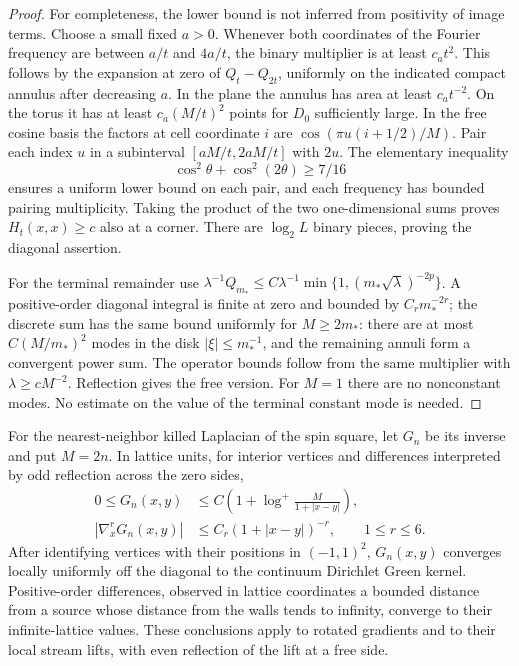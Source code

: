 \begin{proof}
For completeness, the lower bound is not inferred from positivity of image terms.  Choose a small fixed $a>0$.  Whenever both coordinates of the Fourier frequency are between $a/t$ and $4a/t$, the binary multiplier is at least $c_at^2$.  This follows by the expansion at zero of $Q_t-Q_{2t}$, uniformly on the indicated compact annulus after decreasing $a$.  In the plane the annulus has area at least $c_at^{-2}$.  On the torus it has at least $c_a(M/t)^2$ points for $D_0$ sufficiently large.  In the free cosine basis the factors at cell coordinate $i$ are $\cos(\pi u(i+1/2)/M)$.  Pair each index $u$ in a subinterval $[aM/t,2aM/t]$ with $2u$.  The elementary inequality
\[
 \cos^2\theta+\cos^2(2\theta)\ge7/16
\]
ensures a uniform lower bound on each pair, and each frequency has bounded pairing multiplicity.  Taking the product of the two one-dimensional sums proves $H_t(x,x)\ge c$ also at a corner.  There are $\log_2L$ binary pieces, proving the diagonal assertion.

For the terminal remainder use $\lambda^{-1}Q_{m_*}\le C\lambda^{-1}\min\{1,(m_*\sqrt\lambda)^{-2p}\}$.  A positive-order diagonal integral is finite at zero and bounded by $C_rm_*^{-2r}$; the discrete sum has the same bound uniformly for $M\ge2m_*$: there are at most $C(M/m_*)^2$ modes in the disk $|\xi|\le m_*^{-1}$, and the remaining annuli form a convergent power sum.  The operator bounds follow from the same multiplier with $\lambda\ge cM^{-2}$.  Reflection gives the free version.  For $M=1$ there are no nonconstant modes.  No estimate on the value of the terminal constant mode is needed.
\end{proof}

\begin{lemma}\label{rg:green}
For the nearest-neighbor killed Laplacian of the spin square, let $G_n$ be its inverse and put $M=2n$.  In lattice units, for interior vertices and differences interpreted by odd reflection across the zero sides,
\begin{align}
 0\le G_n(x,y)&\le C\left(1+\log^+\frac{M}{1+|x-y|}\right),\label{rg:green-value}\\
 |\nabla_x^rG_n(x,y)|&\le C_r(1+|x-y|)^{-r},\qquad1\le r\le6.\label{rg:green-difference}
\end{align}
After identifying vertices with their positions in $(-1,1)^2$, $G_n(x,y)$ converges locally uniformly off the diagonal to the continuum Dirichlet Green kernel.  Positive-order differences, observed in lattice coordinates a bounded distance from a source whose distance from the walls tends to infinity, converge to their infinite-lattice values.  These conclusions apply to rotated gradients and to their local stream lifts, with even reflection of the lift at a free side.
\end{lemma}

